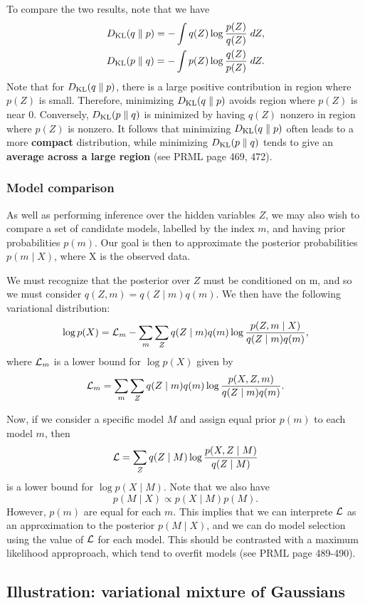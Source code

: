 \documentclass[a4paper]{article}
\begin{document}
To compare the two results, note that we have 
\[
\begin{aligned}
D_{\text{KL}}(q \; \Vert \; p) = - \int q(Z) \log \frac{p(Z)}{q(Z)} \; d Z, \\
D_{\text{KL}}(p \; \Vert \; q) = - \int p(Z) \log \frac{q(Z)}{p(Z)} \; d Z.
\end{aligned}
\]
Note that for $D_{\text{KL}}(q \; \Vert \; p)$, there is a large positive 
contribution in region where $p(Z)$ is small.
Therefore, minimizing $D_{\text{KL}}(q \; \Vert \; p)$ avoids region 
where $p(Z)$ is near $0$. Conversely, 
$D_{\text{KL}}(p \; \Vert \; q)$ is minimized by having $q(Z)$ nonzero 
in region where $p(Z)$ is nonzero. It follows that 
minimizing $D_{\text{KL}}(q \; \Vert \; p)$ often leads to a more \textbf{compact} 
distribution, while minimizing $D_{\text{KL}}(p \; \Vert \; q)$ tends 
to give an \textbf{average across a large region}
(see PRML page 469, 472).

\subsubsection{Model comparison}

As well as performing inference over the hidden variables 
$Z$, we may also wish to compare a set of candidate models, 
labelled by the index $m$, and having prior probabilities 
$p(m)$. Our goal is then to approximate the posterior 
probabilities $p(m \mid X)$, where X is the observed data.

We must recognize that the posterior over $Z$ must be 
conditioned on m, and so we must consider
$q(Z, m) = q(Z \mid m) q(m)$. We then have the following 
variational distribution:
\[
\log p(X) = \mathcal{L}_m - \sum_m \sum_Z q(Z \mid m) q(m) 
\log \frac{p(Z, m \mid X)}{q(Z \mid m) q(m)},
\]
where $\mathcal{L}_m$ is a lower bound for $\log p(X)$ given 
by 
\[
\mathcal{L}_m = \sum_m \sum_Z q(Z \mid m) q(m) 
\log \frac{p(X, Z, m)}{q(Z \mid m) q(m)}.
\]

Now, if we consider a specific model $M$ and 
assign equal prior $p(m)$ to each model $m$, then 
\[
\mathcal{L} = \sum_Z q(Z \mid M) \log \frac{p(X, Z \mid M)}{q(Z \mid M)}
\]
is a lower bound for $\log p(X \mid M)$. Note that 
we also have
\[
p(M \mid X) \propto p(X \mid M) p(M).
\]
However, $p(m)$ are equal for each $m$. This implies that
we can interprete $\mathcal{L}$ as an approximation to the posterior
$p(M \mid X)$, and we can do model selection using the value 
of $\mathcal{L}$ for each model. This should be contrasted with a
maximum likelihood approproach, which tend to overfit 
models (see PRML page 489-490).


\subsection{Illustration: variational mixture of
Gaussians}
\end{document}
